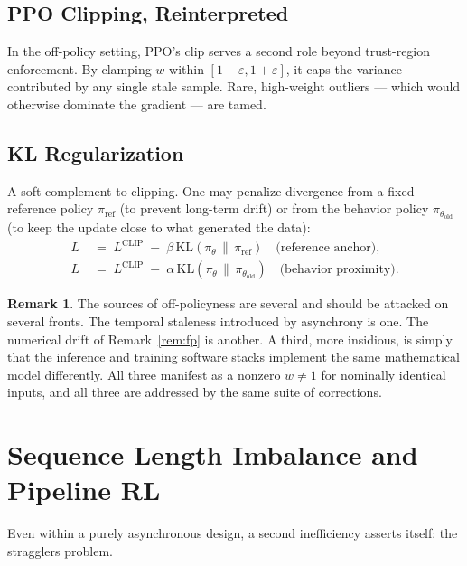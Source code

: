 \documentclass[11pt,a4paper]{article}
\theoremstyle{definition}
\newtheorem{remark}[definition]{Remark}
\theoremstyle{plain}
\newcommand{\KL}{\mathrm{KL}}
\newcommand{\policy}{\pi_\theta}
\newcommand{\oldpolicy}{\pi_{\theta_{\text{old}}}}
\newcommand{\refpolicy}{\pi_{\text{ref}}}
\begin{document}
\subsection{PPO Clipping, Reinterpreted}

In the off-policy setting, PPO's clip serves a second role beyond trust-region enforcement. By clamping $w$ within $[1-\varepsilon, 1+\varepsilon]$, it caps the variance contributed by any single stale sample. Rare, high-weight outliers --- which would otherwise dominate the gradient --- are tamed.

\subsection{KL Regularization}

A soft complement to clipping. One may penalize divergence from a fixed reference policy $\refpolicy$ (to prevent long-term drift) or from the behavior policy $\oldpolicy$ (to keep the update close to what generated the data):
\begin{align}
  L \;&=\; L^{\text{CLIP}} \;-\; \beta\, \KL(\policy \,\|\, \refpolicy) \quad \text{(reference anchor)},\\
  L \;&=\; L^{\text{CLIP}} \;-\; \alpha\, \KL(\policy \,\|\, \oldpolicy) \quad \text{(behavior proximity)}.
\end{align}

\begin{remark}
The sources of off-policyness are several and should be attacked on several fronts. The temporal staleness introduced by asynchrony is one. The numerical drift of Remark~\ref{rem:fp} is another. A third, more insidious, is simply that the inference and training software stacks implement the same mathematical model differently. All three manifest as a nonzero $w \neq 1$ for nominally identical inputs, and all three are addressed by the same suite of corrections.
\end{remark}

\section{Sequence Length Imbalance and Pipeline RL}

Even within a purely asynchronous design, a second inefficiency asserts itself: the stragglers problem.
\end{document}
